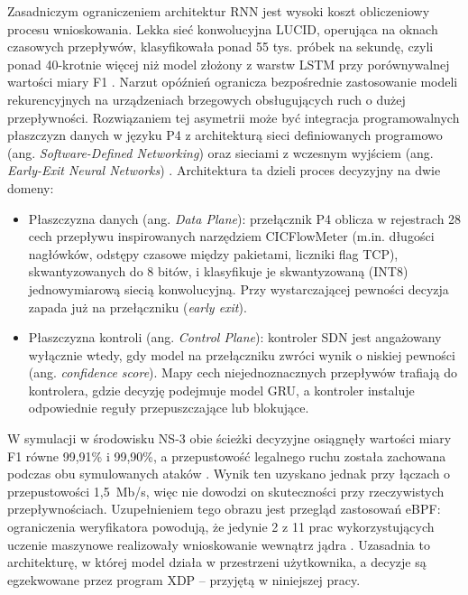 \documentclass[a4paper,12pt]{article}
\begin{document}
Zasadniczym ograniczeniem architektur RNN jest wysoki koszt obliczeniowy procesu wnioskowania. Lekka sieć konwolucyjna LUCID, operująca na oknach czasowych przepływów, klasyfikowała ponad 55 tys. próbek na sekundę, czyli ponad 40-krotnie więcej niż model złożony z warstw LSTM przy porównywalnej wartości miary F1 \cite{doriguzzicorin2020lucid}. Narzut opóźnień ogranicza bezpośrednie zastosowanie modeli rekurencyjnych na urządzeniach brzegowych obsługujących ruch o dużej przepływności. Rozwiązaniem tej asymetrii może być integracja programowalnych płaszczyzn danych w języku P4 z architekturą sieci definiowanych programowo (ang. \textit{Software-Defined Networking}) oraz sieciami z wczesnym wyjściem (ang. \textit{Early-Exit Neural Networks}) \cite{karrakchou2025collaborative}. Architektura ta dzieli proces decyzyjny na dwie domeny:
\begin{itemize}
    \item Płaszczyzna danych (ang. \textit{Data Plane}): przełącznik P4 oblicza w rejestrach 28 cech przepływu inspirowanych narzędziem CICFlowMeter (m.in. długości nagłówków, odstępy czasowe między pakietami, liczniki flag TCP), skwantyzowanych do 8 bitów, i klasyfikuje je skwantyzowaną (INT8) jednowymiarową siecią konwolucyjną. Przy wystarczającej pewności decyzja zapada już na przełączniku (\textit{early exit}).
    \item Płaszczyzna kontroli (ang. \textit{Control Plane}): kontroler SDN jest angażowany wyłącznie wtedy, gdy model na przełączniku zwróci wynik o niskiej pewności (ang. \textit{confidence score}). Mapy cech niejednoznacznych przepływów trafiają do kontrolera, gdzie decyzję podejmuje model GRU, a kontroler instaluje odpowiednie reguły przepuszczające lub blokujące.
\end{itemize}

W symulacji w środowisku NS-3 obie ścieżki decyzyjne osiągnęły wartości miary F1 równe 99,91\% i 99,90\%, a przepustowość legalnego ruchu została zachowana podczas obu symulowanych ataków \cite{karrakchou2025collaborative}. Wynik ten uzyskano jednak przy łączach o przepustowości 1,5~Mb/s, więc nie dowodzi on skuteczności przy rzeczywistych przepływnościach. Uzupełnieniem tego obrazu jest przegląd zastosowań eBPF: ograniczenia weryfikatora powodują, że jedynie 2 z 11 prac wykorzystujących uczenie maszynowe realizowały wnioskowanie wewnątrz jądra \cite{kostopoulos2026ebpf}. Uzasadnia to architekturę, w której model działa w przestrzeni użytkownika, a decyzje są egzekwowane przez program XDP -- przyjętą w niniejszej pracy.
\end{document}
